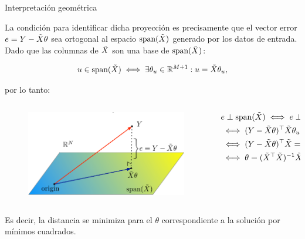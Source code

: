 \documentclass[handout, 9pt]{beamer}
\begin{document}
\begin{frame}{Interpretación geométrica}

La condición para identificar dicha proyección es  precisamente que el vector error $e=Y-\tilde{X} \theta$ sea ortogonal al espacio  $\text{span}(\tilde{X})$ generado por los datos de entrada. Dado que las columnas de $\tilde{X}$ son una base de $\text{span}(\tilde{X})$:

\begin{equation*}
	u\in \text{span}(\tilde{X}) \iff \exists \theta_u\in \mathbb{R}^{M+1}: u=\tilde{X}\theta_u,
\end{equation*}\pause

por lo tanto:

\begin{columns}

\begin{column}{0.5\textwidth}

\begin{figure}[t]
	\centering
	\includegraphics[width=\textwidth]{../../img/cap2_intuicionLinReg.pdf}\\
	
	\label{fig:projection}
\end{figure}
	
\end{column}

\begin{column}{0.5\textwidth}


\begin{align*}
	 &e\perp \text{span}(\tilde{X}) \iff e\perp u,\forall u \in \text{span}(\tilde{X})\\
	 & \iff (Y-\tilde{X} \theta)^\top \tilde{X} \theta_u = 0, \forall \theta_u \in \mathbb{R}^{M+1} \nonumber\\
	& \iff (Y-\tilde{X} \theta)^\top \tilde{X}=0\\
	& \iff  \theta = (\tilde{X}^\top\tilde{X})^{-1}\tilde{X}^\top Y
\end{align*}

\end{column}

\end{columns} 

\pause 
\vspace{1em}
Es decir, la distancia se minimiza para el $\theta$ correspondiente a la solución por mínimos cuadrados.
	
\end{frame}
\end{document}
